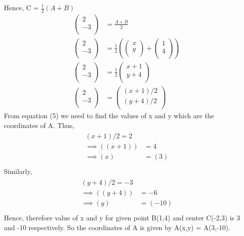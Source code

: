 \documentclass[12pt]{article}
\providecommand{\brak}[1]{\ensuremath{\left(#1\right)}}
\newcommand{\myvec}[1]{\ensuremath{\begin{pmatrix}#1\end{pmatrix}}}
\begin{document}
\begin{enumerate}
Hence,	
			C = $\frac{1}{2}(A+B)$
	\begin{align}
	\myvec{
	    2\\
	   -3\\
		} &= \frac{A+B}{2} \\
		\myvec{
	    2\\
	   -3\\
		} &= \frac{1}{2}\brak{\myvec{x\\y\\}+\myvec{1\\4\\}} \\
		\myvec{
	    2\\
	   -3\\
		} &= \frac{1}{2}\myvec{x+1\\y+4\\}\\
		\myvec{
	    2\\
	   -3\\
		} &= \myvec{(x+1)/2\\(y+4)/2\\}	
	\end{align}       
	 From equation (5) we need to find the values of x and y which are the coordinates of A. Thus,
    \begin{align}
	\begin{split}	                     
	{(x+1)/2} = 2\\
	\implies  
	\brak{(x+1)}& = 4 \\
	\implies 
	\brak{x}& = (3)\\
    \end{split}
    \end{align}
    Similarly,
    \begin{align}
    \begin{split}
    {(y+4)/2} = -3\\
    \implies
    \brak{(y+4)}& = -6 \\
    \implies
    \brak {y}& = (-10)\\
    \end{split}
    \end{align}
    Hence, therefore value of x and y for given point B(1,4) and center C(-2,3) is 3 and -10 respectively. So the coordinates of A is given by 
    A(x,y) = A(3,-10).	
\hspace{3mm}
\begin{figure}[!h]
\begin{center}	

\end{center}
\end{figure}
\end{enumerate}
\end{document}
